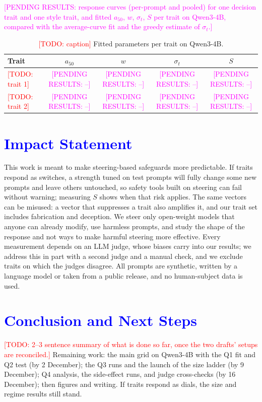 \documentclass[11pt]{article}
\newcommand{\todo}[1]{\textcolor{red}{[TODO: #1]}}
\newcommand{\upd}[1]{{\color{blue}#1}}
\newcommand{\pending}[1]{\textcolor{magenta}{[PENDING RESULTS: #1]}}
\begin{document}
\pending{response curves (per-prompt and pooled) for one decision trait and one
style trait, and fitted $a_{50}$, $w$, $\sigma_t$, $S$ per trait on Qwen3-4B,
compared with the average-curve fit and the greedy estimate of $\sigma_t$.}

\begin{table}[t]
\centering
\small
\begin{tabular}{lcccc}
\toprule
Trait & $a_{50}$ & $w$ & $\sigma_t$ & $S$ \\
\midrule
\todo{trait 1} & \pending{--} & \pending{--} & \pending{--} & \pending{--} \\
\todo{trait 2} & \pending{--} & \pending{--} & \pending{--} & \pending{--} \\
\bottomrule
\end{tabular}
\caption{\todo{caption} Fitted parameters per trait on Qwen3-4B.}
\label{tab:results}
\end{table}

\section{\textcolor{blue}{Impact Statement}}
\upd{This work is meant to make steering-based safeguards more predictable. If
traits respond as switches, a strength tuned on test prompts will fully change
some new prompts and leave others untouched, so safety tools built on steering
can fail without warning; measuring $S$ shows when that risk applies. The same
vectors can be misused: a vector that suppresses a trait also amplifies it, and
our trait set includes fabrication and deception. We steer only open-weight
models that anyone can already modify, use harmless prompts, and study the shape
of the response and not ways to make harmful steering more effective. Every
measurement depends on an LLM judge, whose biases carry into our results; we
address this in part with a second judge and a manual check, and we exclude
traits on which the judges disagree. All prompts are synthetic, written by a
language model or taken from a public release, and no human-subject data is
used.}

\section{\textcolor{blue}{Conclusion and Next Steps}}
\todo{2--3 sentence summary of what is done so far, once the two drafts'
setups are reconciled.}
\upd{Remaining work: the main grid on Qwen3-4B with the Q1 fit and Q2 test (by 2
December); the Q3 runs and the launch of the size ladder (by 9 December); Q4
analysis, the side-effect runs, and judge cross-checks (by 16 December); then
figures and writing. If traits respond as dials, the size and regime results
still stand.}
\end{document}

